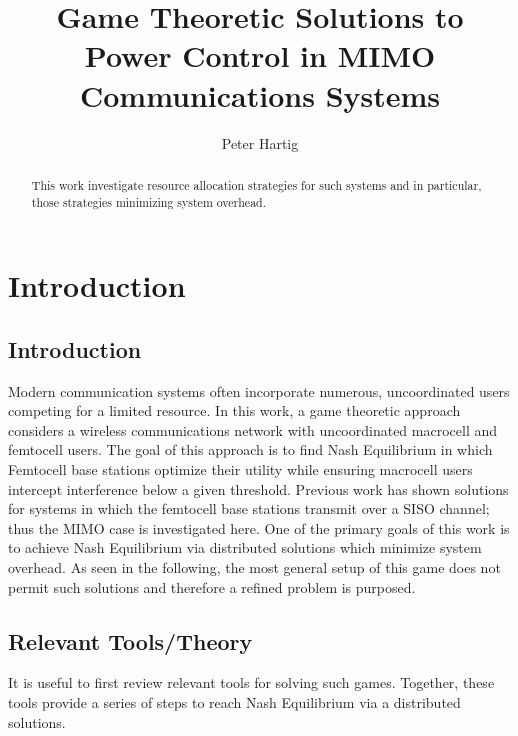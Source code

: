 \documentclass[12pt,a4paper]{report}
\title{Game Theoretic Solutions to Power Control in MIMO Communications Systems}
\author{Peter Hartig}
\begin{document}
\maketitle

\begin{abstract}
This work investigate resource allocation strategies for such systems and in particular, those strategies minimizing system overhead. 
\end{abstract}

\newpage
\tableofcontents
\newpage

\chapter{Introduction}
\section{Introduction}
Modern communication systems often incorporate numerous, uncoordinated users competing for a limited resource.
In this work, a game theoretic approach considers a wireless communications network with uncoordinated  macrocell and femtocell users. The goal of this approach is to find Nash Equilibrium in which Femtocell base stations optimize their utility while ensuring macrocell users intercept interference below a given threshold. 
Previous work has shown solutions for systems in which the femtocell base stations transmit over a SISO channel; thus the MIMO case is investigated here. 
One of the primary goals of this work is to achieve Nash Equilibrium via distributed solutions which minimize system overhead. As seen in the following, the most general setup of this game does not permit such solutions and therefore a refined problem is purposed.


\section{Relevant Tools/Theory}

It is useful to first review relevant tools for solving such games. Together, these tools provide a series of steps to reach Nash Equilibrium via a distributed solutions. 
\end{document}
